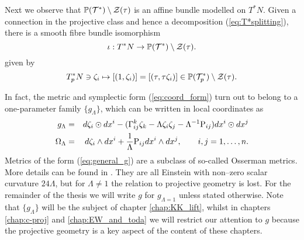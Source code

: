 \begin{rmk}
Next we observe that $\mathbb{P}(\mathcal{T}^*)\setminus \mathcal{Z}(\tau)$ is an affine bundle modelled on $T^* N$. Given a connection in the projective class and hence a decomposition (\ref{eq:T*splitting}), there is a smooth fibre bundle isomorphism
  \begin{equation}\label{key-id}
\iota : T^* N\to \mathbb{P}(\mathcal{T}^*)\setminus \mathcal{Z}(\tau).
    \end{equation}
%
given by
\begin{equation} \label{eq:T*N_is_M}
T_p^*N\ni \zeta_i  \mapsto [(1,\zeta_i)]=[(\tau,\tau \zeta_i)]\in
\mathbb{P}(\mathcal{T}_p^*)\setminus \mathcal{Z}(\tau) .
\end{equation}
\end{rmk}


\begin{rmk}
In fact, the metric and symplectic form (\ref{eq:coord_form}) turn
out to belong to a one-parameter family $\{g_{\Lambda}\}$, which
can be written in local coordinates as 
\begin{eqnarray}
g_{\Lambda} & = &  d\zeta_{i}\odot dx^{i}-(\Gamma_{ij}^{k}\zeta_{k}-\Lambda \zeta_{i}\zeta_{j}-\Lambda^{-1}\mathrm{P}_{ij}) dx^{i}\odot dx^{j}\label{eq:general_g}\\
\Omega_{\Lambda} & = &  d\zeta_{i}\wedge dx^{i}+\frac{1}{\Lambda}\mathrm{P}_{ij} dx^{i}\wedge dx^{j},\qquad i,j=1,\dots ,n.\label{eq:general_omega}
\end{eqnarray}
Metrics of the form (\ref{eq:general_g}) are a subclass of so-called
Osserman metrics. More details can be found in \cite{No-louzao1991}.
They are all Einstein with non--zero scalar curvature $24\Lambda$, but for $\Lambda\neq1$ the relation to projective geometry is lost. For the remainder of the thesis we will write $g$ for $g_{\Lambda=1}$ unless stated otherwise. Note that $\{g_\Lambda\}$ will be the subject of chapter \ref{chap:KK_lift}, whilst in chapters \ref{chap:c-proj} and \ref{chap:EW_and_toda} we will restrict our attention to $g$ because the projective geometry is a key aspect of the content of these chapters.
\end{rmk}

